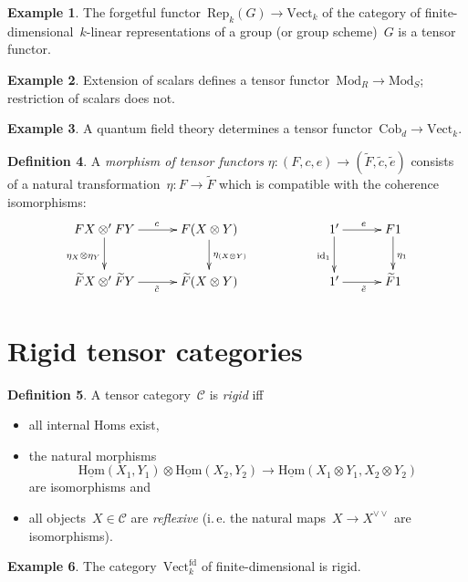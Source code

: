 \documentclass[a4paper,english,12pt]{scrartcl}
\theoremstyle{definition}
\newtheorem{defn}{Definition}[section]
\newtheorem{ex}[defn]{Example}
\theoremstyle{plain}
\theoremstyle{remark}
\newcommand{\C}{\mathcal{C}}
\newcommand{\id}{\mathrm{id}}
\renewcommand{\_}{\mathpunct{.}\,}
\newcommand{\?}{\,{:}\,}
\newcommand{\Mod}{\mathrm{Mod}}
\newcommand{\Vect}{\mathrm{Vect}}
\newcommand{\Hom}{\underline{\mathrm{Hom}}}
\newcommand{\Rep}{\mathrm{Rep}}
\newcommand{\Cob}{\mathrm{Cob}}
\begin{document}
\begin{ex}The forgetful functor~$\Rep_k(G) \to \Vect_k$ of the category
of finite-dimensional~$k$-linear representations of a group (or group
scheme)~$G$ is a tensor functor.\end{ex}

\begin{ex}Extension of scalars defines a tensor functor~$\Mod_R \to
\Mod_S$; restriction of scalars does not.\end{ex}

\begin{ex}A quantum field theory determines a tensor functor~$\Cob_d \to
\Vect_k$.\end{ex}

\begin{defn}A \emph{morphism of tensor functors} $\eta : (F,c,e) \to
(\widetilde F,\tilde c,\tilde e)$ consists of a natural transformation~$\eta : F \to
\widetilde F$ which is compatible with the coherence isomorphisms:
\[ \xymatrixcolsep{2.5pc}\xymatrix{
  FX \otimes' FY \ar[d]_{\eta_X \otimes \eta_Y} \ar[r]^c &
  F(X \otimes Y) \ar[d]^{\eta_{(X \otimes Y)}} &&
  1' \ar[r]^e \ar[d]_{\id_1} & F1 \ar[d]^{\eta_1} \\
  \widetilde F X \otimes' \widetilde F Y \ar[r]_{\tilde c} &
  \widetilde F(X \otimes Y) &&
  1' \ar[r]_{\tilde e} & \widetilde F1
} \]
\end{defn}


\section{Rigid tensor categories}

\begin{defn}A tensor category~$\C$ is \emph{rigid} iff
\begin{itemize}
\item all internal Homs exist,
\item the natural morphisms
\[ \Hom(X_1,Y_1) \otimes \Hom(X_2,Y_2) \longrightarrow
  \Hom(X_1 \otimes Y_1, X_2 \otimes Y_2) \]
are isomorphisms and
\item all objects~$X \in \C$ are \emph{reflexive} (i.\,e. the natural maps~$X
\to X^{\vee\vee}$ are isomorphisms).
\end{itemize}
\end{defn}

\begin{ex}The category~$\Vect^\mathrm{fd}_k$ of finite-dimensional is
rigid.\end{ex}
\end{document}
